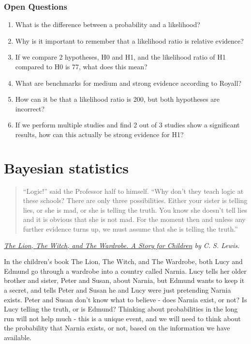 \documentclass[
  oneside]{book}
\begin{document}
\hypertarget{open-questions-2}{%
\subsection{Open Questions}\label{open-questions-2}}

\begin{enumerate}
\def\labelenumi{\arabic{enumi}.}
\item
  What is the difference between a probability and a likelihood?
\item
  Why is it important to remember that a likelihood ratio is relative evidence?
\item
  If we compare 2 hypotheses, H0 and H1, and the likelihood ratio of H1 compared to H0 is 77, what does this mean?
\item
  What are benchmarks for medium and strong evidence according to Royall?
\item
  How can it be that a likelihood ratio is 200, but both hypotheses are incorrect?
\item
  If we perform multiple studies and find 2 out of 3 studies show a significant results, how can this actually be strong evidence for H1?
\end{enumerate}

\hypertarget{bayes}{%
\chapter{Bayesian statistics}\label{bayes}}

\begin{quote}
``Logic!'' said the Professor half to himself. ``Why don't they teach logic at these schools? There are only three possibilities. Either your sister is telling lies, or she is mad, or she is telling the truth. You know she doesn't tell lies and it is obvious that she is not mad. For the moment then and unless any further evidence turns up, we must assume that she is telling the truth.''
\end{quote}

\emph{\href{https://gutenberg.ca/ebooks/lewiscs-thelionthewitchandthewardrobe/lewiscs-thelionthewitchandthewardrobe-00-h.html}{The Lion, The Witch, and The Wardrobe. A Story for Children} by C. S. Lewis.}

In the children's book The Lion, The Witch, and The Wardrobe, both Lucy and Edmund go through a wardrobe into a country called Narnia. Lucy tells her older brother and sister, Peter and Susan, about Narnia, but Edmund wants to keep it a secret, and tells Peter and Susan he and Lucy were just pretending Narnia exists. Peter and Susan don't know what to believe - does Narnia exist, or not? Is Lucy telling the truth, or is Edmund? Thinking about probabilities in the long run will not help much - this is a unique event, and we will need to think about the probability that Narnia exists, or not, based on the information we have available.
\end{document}
